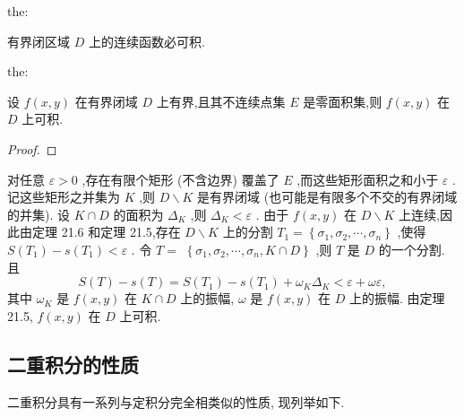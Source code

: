 \begin{theorem}{}{the:}

\end{theorem}
 有界闭区域 \(D\) 上的连续函数必可积.

\begin{theorem}{}{the:}

\end{theorem}
 设 \(f\left( {x,y}\right)\) 在有界闭域 \(D\) 上有界,且其不连续点集 \(E\) 是零面积集,则 \(f\left( {x,y}\right)\) 在 \(D\) 上可积.

\begin{proof}

\end{proof}
对任意 \(\varepsilon  > 0\) ,存在有限个矩形 (不含边界) 覆盖了 \(E\) ,而这些矩形面积之和小于 \(\varepsilon\) . 记这些矩形之并集为 \(K\) ,则 \(D \smallsetminus  K\) 是有界闭域 (也可能是有限多个不交的有界闭域的并集). 设 \(K \cap  D\) 的面积为 \({\Delta }_{K}\) ,则 \({\Delta }_{K} < \varepsilon\) . 由于 \(f\left( {x,y}\right)\) 在 \(D \smallsetminus  K\) 上连续,因此由定理 21.6 和定理 21.5,存在 \(D \smallsetminus  K\) 上的分割 \({T}_{1} = \left\{  {{\sigma }_{1},{\sigma }_{2},\cdots ,{\sigma }_{n}}\right\}\) ,使得 \(S\left( {T}_{1}\right)  - s\left( {T}_{1}\right)  < \varepsilon\) . 令 \(T =\)  \(\left\{  {{\sigma }_{1},{\sigma }_{2},\cdots ,{\sigma }_{n},K \cap  D}\right\}\) ,则 \(T\) 是 \(D\) 的一个分割. 且
\[
S\left( T\right)  - s\left( T\right)  = S\left( {T}_{1}\right)  - s\left( {T}_{1}\right)  + {\omega }_{K}{\Delta }_{K} < \varepsilon  + {\omega \varepsilon },
\]
其中 \({\omega }_{K}\) 是 \(f\left( {x,y}\right)\) 在 \(K \cap  D\) 上的振幅, \(\omega\) 是 \(f\left( {x,y}\right)\) 在 \(D\) 上的振幅. 由定理 21.5, \(f\left( {x,y}\right)\) 在 \(D\) 上可积.

\subsection{二重积分的性质}

二重积分具有一系列与定积分完全相类似的性质, 现列举如下.

